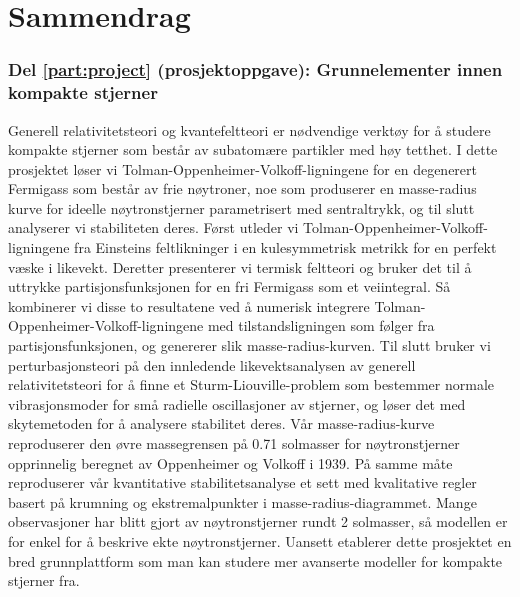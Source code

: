 \chapter*{Sammendrag}%

\subsection*{Del \ref{part:project} (prosjektoppgave): Grunnelementer innen kompakte stjerner}

Generell relativitetsteori og kvantefeltteori er nødvendige verktøy for å studere kompakte stjerner som består av subatomære partikler med høy tetthet.
I dette prosjektet løser vi Tolman-Oppenheimer-Volkoff-ligningene for en degenerert Fermigass som består av frie nøytroner,
noe som produserer en masse-radius kurve for ideelle nøytronstjerner parametrisert med sentraltrykk,
og til slutt analyserer vi stabiliteten deres.
Først utleder vi Tolman-Oppenheimer-Volkoff-ligningene fra Einsteins feltlikninger
i en kulesymmetrisk metrikk for en perfekt væske i likevekt.
Deretter presenterer vi termisk feltteori og bruker det
til å uttrykke partisjonsfunksjonen for en fri Fermigass som et veiintegral.
Så kombinerer vi disse to resultatene ved å numerisk integrere Tolman-Oppenheimer-Volkoff-ligningene
med tilstandsligningen som følger fra partisjonsfunksjonen, og genererer slik masse-radius-kurven.
Til slutt bruker vi perturbasjonsteori på den innledende likevektsanalysen av generell relativitetsteori
for å finne et Sturm-Liouville-problem som bestemmer normale vibrasjonsmoder for små radielle oscillasjoner av stjerner,
og løser det med skytemetoden for å analysere stabilitet deres.
Vår masse-radius-kurve reproduserer den øvre massegrensen på 0.71 solmasser
for nøytronstjerner opprinnelig beregnet av Oppenheimer og Volkoff i 1939.
På samme måte reproduserer vår kvantitative stabilitetsanalyse
et sett med kvalitative regler basert på krumning og ekstremalpunkter i masse-radius-diagrammet.
Mange observasjoner har blitt gjort av nøytronstjerner rundt 2 solmasser,
så modellen er for enkel for å beskrive ekte nøytronstjerner.
Uansett etablerer dette prosjektet en bred grunnplattform
som man kan studere mer avanserte modeller for kompakte stjerner fra.

\subsection*{}

